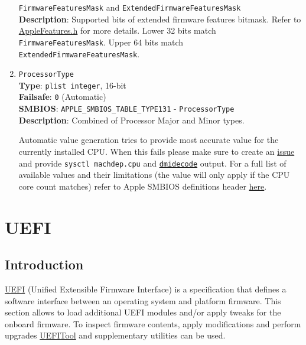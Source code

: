 \documentclass[]{article}
\makeatletter
\renewcommand{\label}[1]{%
\zref@wrapper@immediate{\oldlabel{#1}}}  %
\makeatother
\begin{document}
\begin{enumerate}
  \texttt{FirmwareFeaturesMask} and
  \texttt{ExtendedFirmwareFeaturesMask}\\
  \textbf{Description}: Supported bits of extended firmware features
  bitmask. Refer to
  \href{https://github.com/acidanthera/OpenCorePkg/blob/master/Include/Apple/IndustryStandard/AppleFeatures.h}{AppleFeatures.h}
  for more details. Lower 32 bits match \texttt{FirmwareFeaturesMask}.
  Upper 64 bits match \texttt{ExtendedFirmwareFeaturesMask}.
\item
  \texttt{ProcessorType}\\
  \textbf{Type}: \texttt{plist\ integer}, 16-bit\\
  \textbf{Failsafe}: \texttt{0} (Automatic)\\
  \textbf{SMBIOS}: \texttt{APPLE\_SMBIOS\_TABLE\_TYPE131} -
  \texttt{ProcessorType}\\
  \textbf{Description}: Combined of Processor Major and Minor types.

  Automatic value generation tries to provide most accurate value for
  the currently installed CPU. When this fails please make sure to create
  an \href{https://github.com/acidanthera/bugtracker/issues}{issue} and
  provide \texttt{sysctl machdep.cpu} and
  \href{https://github.com/acidanthera/dmidecode}{\texttt{dmidecode}} output.
  For a full list of available values and their limitations (the value will
  only apply if the CPU core count matches) refer to Apple SMBIOS definitions header
  \href{https://github.com/acidanthera/OpenCorePkg/blob/master/Include/Apple/IndustryStandard/AppleSmBios.h}{here}.
\end{enumerate}

\section{UEFI}\label{uefi}

\subsection{Introduction}\label{uefiintro}

\href{https://uefi.org/specifications}{UEFI} (Unified Extensible Firmware Interface)
is a specification that defines a software interface between an operating system and
platform firmware. This section allows to load additional UEFI modules and/or apply
tweaks for the onboard firmware. To inspect firmware contents, apply modifications
and perform upgrades \href{https://github.com/LongSoft/UEFITool/releases}{UEFITool}
and supplementary utilities can be used.
\end{document}
